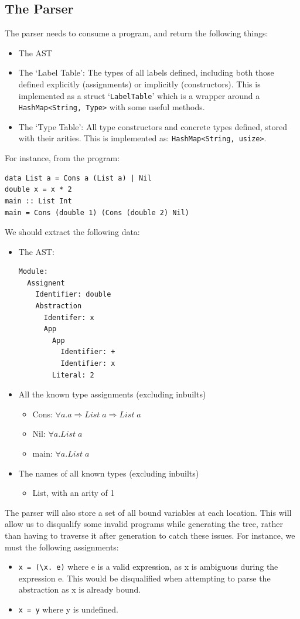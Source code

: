 \subsection{The Parser}
The parser needs to consume a program, and return the following things:
\begin{itemize}
    \item The AST
    \item The `Label Table': The types of all labels defined, including both those defined explicitly (assignments) or implicitly (constructors). This is implemented as a struct `\verb|LabelTable|' which is a wrapper around a \verb|HashMap<String, Type>| with some useful methods. 
    \item The `Type Table': All type constructors and concrete types defined, stored with their arities. This is implemented as: \verb|HashMap<String, usize>|.
\end{itemize}
For instance, from the program:
\begin{lstlisting}[]
data List a = Cons a (List a) | Nil
double x = x * 2	
main :: List Int
main = Cons (double 1) (Cons (double 2) Nil)
\end{lstlisting}
We should extract the following data:
\begin{itemize}
    \item The AST: 
    \begin{lstlisting}[]
Module:
  Assignent
    Identifier: double
    Abstraction
      Identifer: x
      App
        App
          Identifier: +
          Identifier: x
        Literal: 2
    \end{lstlisting}
    \item All the known type assignments (excluding inbuilts)
        \begin{itemize}
            \item Cons: \(\forall a. a \Rightarrow List\;a\Rightarrow List\;a\)
            \item Nil: \(\forall a. List\;a\)
            \item main: \(\forall a. List\;a\)
        \end{itemize}
    \item The names of all known types (excluding inbuilts) 
        \begin{itemize}
            \item List, with an arity of 1
        \end{itemize}
\end{itemize}

The parser will also store a set of all bound variables at each location. This will allow us to disqualify some invalid programs while generating the tree, rather than having to traverse it after generation to catch these issues. For instance, we must the following assignments:
\begin{itemize}
    \item \verb|x = (\x. e)| where e is a valid expression, as x is ambiguous during the expression e. This would be disqualified when attempting to parse the abstraction as x is already bound.  
    \item \verb|x = y| where y is undefined.
\end{itemize}

